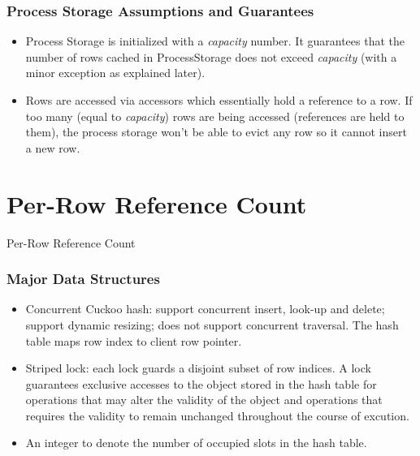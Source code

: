 \documentclass{beamer}
\begin{document}
\begin{frame}
\frametitle{Process Storage Assumptions and Guarantees}
\begin{itemize}
\item Process Storage is initialized with a \emph{capacity} number. It 
guarantees that the number of rows cached in ProcessStorage does not exceed 
\emph{capacity} (with a minor exception as explained later).

\item Rows are accessed via accessors which essentially hold a reference to
a row. If too many (equal to \emph{capacity}) rows are being accessed 
(references are held to them), the process storage won't be able to evict
any row so it cannot insert a new row.

\end{itemize}
\end{frame}

\section{Per-Row Reference Count}

\begin{frame}
Per-Row Reference Count
\end{frame}

\begin{frame}
\frametitle{Major Data Structures}
\begin{itemize}
\item Concurrent Cuckoo hash: support concurrent insert, look-up and delete; 
support dynamic resizing; does not support concurrent traversal. The hash table
maps row index to client row pointer.
\item Striped lock: each lock guards a disjoint subset of row indices. A lock 
guarantees exclusive accesses to the object stored in the hash table for operations
that may alter the validity of the object and operations that requires the validity 
to remain unchanged throughout the course of excution.
\item An integer to denote the number of occupied slots in the hash table.
\end{itemize}
\end{frame}
\end{document}
